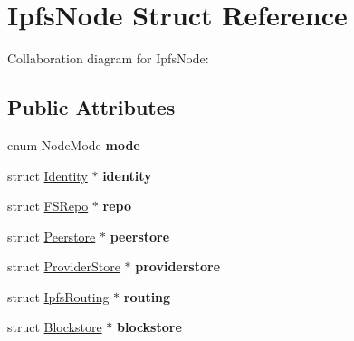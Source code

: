 \hypertarget{struct_ipfs_node}{}\section{Ipfs\+Node Struct Reference}
\label{struct_ipfs_node}


Collaboration diagram for Ipfs\+Node\+:
\subsection*{Public Attributes}
\begin{DoxyCompactItemize}
\item 
\mbox{\label{struct_ipfs_node_a8111443d9bb86af92b3a76b10e104de3}} 
enum Node\+Mode {\bfseries mode}
\item 
\mbox{\label{struct_ipfs_node_afac6e16c0903c1be25febd12929b3656}} 
struct \mbox{\hyperlink{struct_identity}{Identity}} $\ast$ {\bfseries identity}
\item 
\mbox{\label{struct_ipfs_node_a5f746760f134c2f37656f906cca42e3f}} 
struct \mbox{\hyperlink{struct_f_s_repo}{F\+S\+Repo}} $\ast$ {\bfseries repo}
\item 
\mbox{\label{struct_ipfs_node_a6a1b3e0b8bb3c9d953f68fe70f6e9357}} 
struct \mbox{\hyperlink{struct_peerstore}{Peerstore}} $\ast$ {\bfseries peerstore}
\item 
\mbox{\label{struct_ipfs_node_a1d6a11c03103fc0b4d79fb1aab3fdb55}} 
struct \mbox{\hyperlink{struct_provider_store}{Provider\+Store}} $\ast$ {\bfseries providerstore}
\item 
\mbox{\label{struct_ipfs_node_a1df45e869d354c0dfd50aff2dfe44f99}} 
struct \mbox{\hyperlink{struct_ipfs_routing}{Ipfs\+Routing}} $\ast$ {\bfseries routing}
\item 
\mbox{\label{struct_ipfs_node_ad69e5c808108032f1aad88a0ce1553ac}} 
struct \mbox{\hyperlink{struct_blockstore}{Blockstore}} $\ast$ {\bfseries blockstore}
\item 
\mbox{\label{struct_ipfs_node_a223cd0a5a9d87e8ad9cc086965ae4bae}} 

\end{DoxyCompactItemize}

